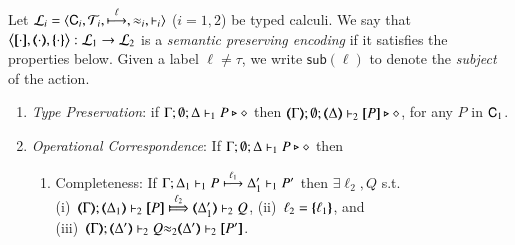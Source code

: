 \begin{definition}\rm
\label{def:ep}
       Let  $\tyl{L}_i=\calc{\CAL_i}{{\cal{T}}_i}{\hby{\ell}}{\wb_i}{\proves_i}$
       ($i=1,2$) be typed calculi. 
We say that $\enco{\map{\cdot}, \mapt{\cdot}, \mapa{\cdot}}: \tyl{L}_1 \to \tyl{L}_2$ is a \emph{semantic preserving encoding}
if it satisfies the properties below.
Given a label $\ell \neq \tau$, we write 
$\mathsf{sub}(\ell)$
to denote the \emph{subject} of the action.
	
	\begin{enumerate}[1.]
		\item \emph{Type Preservation}:
	if
	$\Gamma; \emptyset; \Delta \proves_1 P \hastype \Proc$ then 
	$\mapt{\Gamma}; \emptyset; \mapt{\Delta} \proves_2 \map{P} \hastype \Proc$,  
	for any   $P$ in $\CAL_1$.

	\item \emph{Operational Correspondence}: If $\Gamma; \emptyset; \Delta \proves_1 P \hastype \Proc$ then
		\begin{enumerate}
			\item	Completeness: 
			   If  
$\stytraarg{\Gamma}{\ell_1}{\Delta_1}{P}{\Delta'_1}{P'}{1}$
			   then $\exists \ell_2, Q$ s.t. \\
 (i)~$\wtytraarg{\mapt{\Gamma}}{\ell_2}{\mapt{\Delta_1}}{\map{P}}{\mapt{\Delta'_1}}{Q}{2}$,
			    (ii)~$\ell_2 = \mapa{\ell_1}$, 
			    and \\
				(iii)~${\mapt{\Gamma}};{\mapt{\Delta'}}\proves_2 {Q}{\wb_2}
{\mapt{\Delta'}}\proves_2 {\map{P'}}$.
				
				
			    				
				

\end{enumerate}
\end{enumerate}
\end{definition}
